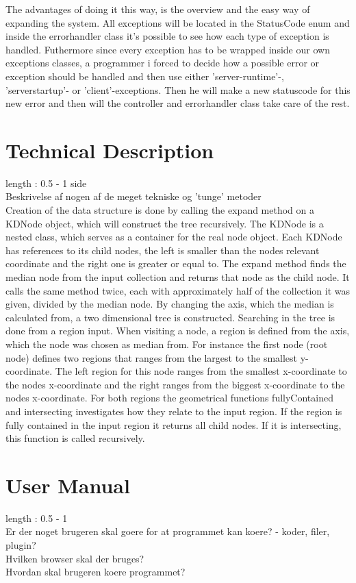 \documentclass[a4paper,10pt,titlepage]{article}
\begin{document}
			The advantages of doing it this way, is the overview and the easy way of expanding the system. All exceptions will be located in the StatusCode enum and inside the errorhandler class it's possible to see how each type of exception is handled. Futhermore since every exception has to be wrapped inside our own exceptions classes, a programmer i forced to decide how a possible error or exception should be handled and then use either 'server-runtime'-, 'serverstartup'- or 'client'-exceptions. Then he will make a new statuscode for this new error and then will the controller and errorhandler class take care of the rest. 
			
			
			
	\section{Technical Description}
		length : 0.5 - 1 side\\
		Beskrivelse af nogen af de meget tekniske og 'tunge' metoder\\
Creation of the data structure is done by calling the expand method on a KDNode object, which will construct the tree recursively. The KDNode is a nested class, which serves as a container for the real node object. Each KDNode has references to its child nodes, the left is smaller than the nodes relevant coordinate and the right one is greater or equal to. The expand method finds the median node from the input collection and returns that node as the child node. It calls the same method twice, each with approximately half of the collection it was given, divided by the median node. By changing the axis, which the median is calculated from, a two dimensional tree is constructed.
Searching in the tree is done from a region input. When visiting a node, a region is defined from the axis, which the node was chosen as median from. For instance the first node (root node) defines two regions that ranges from the largest to the smallest y-coordinate. The left region for this node ranges from the smallest x-coordinate to the nodes x-coordinate and the right ranges from the biggest x-coordinate to the nodes x-coordinate. For both regions the geometrical functions fullyContained and intersecting investigates how they relate to the input region. If the region is fully contained in the input region it returns all child nodes. If it is intersecting, this function is called recursively.

		
	\section{User Manual}
		length : 0.5 - 1\\
		Er der noget brugeren skal goere for at programmet kan koere? - koder, filer, plugin?\\
		Hvilken browser skal der bruges?\\
		Hvordan skal brugeren koere programmet?\\
		
\end{document}

